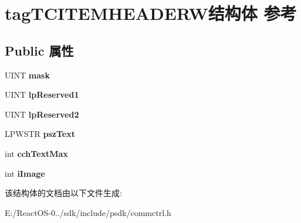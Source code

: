 \hypertarget{structtag_t_c_i_t_e_m_h_e_a_d_e_r_w}{}\section{tag\+T\+C\+I\+T\+E\+M\+H\+E\+A\+D\+E\+R\+W结构体 参考}
\label{structtag_t_c_i_t_e_m_h_e_a_d_e_r_w}
\subsection*{Public 属性}
\begin{DoxyCompactItemize}
\item 
\mbox{\label{structtag_t_c_i_t_e_m_h_e_a_d_e_r_w_ad51e2d4fc99e8821a0d5f9c38d22ab36}} 
U\+I\+NT {\bfseries mask}
\item 
\mbox{\label{structtag_t_c_i_t_e_m_h_e_a_d_e_r_w_ac0a17604234a6157c20aff956fd9f67f}} 
U\+I\+NT {\bfseries lp\+Reserved1}
\item 
\mbox{\label{structtag_t_c_i_t_e_m_h_e_a_d_e_r_w_a8503ae998b78c4935b9717a385aeb0b4}} 
U\+I\+NT {\bfseries lp\+Reserved2}
\item 
\mbox{\label{structtag_t_c_i_t_e_m_h_e_a_d_e_r_w_a5ce73248bcdde396d84a02a249be777f}} 
L\+P\+W\+S\+TR {\bfseries psz\+Text}
\item 
\mbox{\label{structtag_t_c_i_t_e_m_h_e_a_d_e_r_w_acc5459393ad66a1baa55d2654570c1ef}} 
int {\bfseries cch\+Text\+Max}
\item 
\mbox{\label{structtag_t_c_i_t_e_m_h_e_a_d_e_r_w_a42eee0b07f55a33de0ece2e29158c92c}} 
int {\bfseries i\+Image}
\end{DoxyCompactItemize}


该结构体的文档由以下文件生成\+:\begin{DoxyCompactItemize}
\item 
E\+:/\+React\+O\+S-\/0../sdk/include/psdk/commctrl.\+h\end{DoxyCompactItemize}
